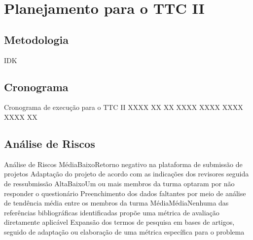 

\section{Planejamento para o TTC II} \label{sec:plan2}

\subsection{Metodologia} \label{sec:methodology2}

IDK

\subsection{Cronograma} \label{sec:schedule}

\begin{cronograma}{Cronograma de execução para o TTC II}\label{board:schedule2}
     {XXXX}{} {}{}{}
       {}    {XX \nX\nX}{}{}{}
      {}    {\nX\nX XX} {XXXX} {} {}
        {}    {}         {}     {XXXX} {}
               {}    {}         {XXXX} {XXXX} {XX \nX\nX}
\end{cronograma}

\subsection{Análise de Riscos} \label{sec:risks}

\begin{riscos}{Análise de Riscos}\label{quadro:riscos}
    \uHeaderRiscos
          {Média}{Baixo}{Retorno negativo na plataforma de submissão de projetos}
          {Adaptação do projeto de acordo com as indicações dos revisores seguida de ressubmissão}
          {Alta}{Baixo}{Um ou mais membros da turma optaram por não responder o questionário}
          {Preenchimento dos dados faltantes por meio de análise de tendência média entre os membros da turma}
          {Média}{Média}{Nenhuma das referências bibliográficas identificadas propõe uma métrica de avaliação diretamente aplicável}
          {Expansão dos termos de pesquisa em bases de artigos, seguido de adaptação ou elaboração de uma métrica específica para o problema}
\end{riscos}
